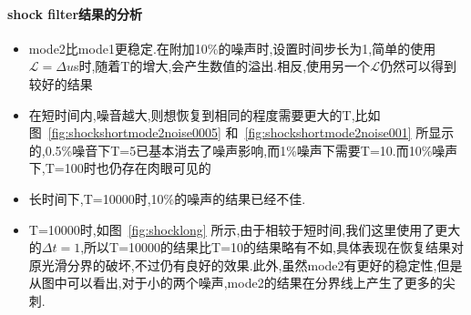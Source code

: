 \documentclass[UTF8]{ctexart}
\begin{document}
\paragraph{shock filter结果的分析}
\begin{itemize}
\item mode2比mode1更稳定.在附加10\%的噪声时,设置时间步长为1,简单的使用$\mathscr{L}=\Delta u$s时,随着T的增大,会产生数值的溢出.相反,使用另一个$\mathscr{L}$仍然可以得到较好的结果
\item 在短时间内,噪音越大,则想恢复到相同的程度需要更大的T,比如图~\ref{fig:shockshortmode2noise0005} 和~\ref{fig:shockshortmode2noise001} 所显示的,0.5\%噪音下T=5已基本消去了噪声影响,而1\%噪声下需要T=10.而10\%噪声下,T=100时也仍存在肉眼可见的
\item 长时间下,T=10000时,10\%的噪声的结果已经不佳.
\item T=10000时,如图~\ref{fig:shocklong} 所示,由于相较于短时间,我们这里使用了更大的$\Delta t=1$,所以T=10000的结果比T=10的结果略有不如,具体表现在恢复结果对原光滑分界的破坏,不过仍有良好的效果.此外,虽然mode2有更好的稳定性,但是从图中可以看出,对于小的两个噪声,mode2的结果在分界线上产生了更多的尖刺.
\end{itemize}
\end{document}
